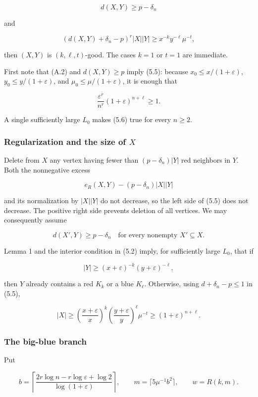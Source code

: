 \[
d(X,Y)\ge p-\delta_n
\tag{5.4}
\]

and

\[
(d(X,Y)+\delta_n-p)^r|X||Y|
\ge x^{-k}y^{-\ell}\mu^{-t},
\tag{5.5}
\]

then \((X,Y)\) is \((k,\ell,t)\)-good. The cases \(k=1\) or \(t=1\) are
immediate.

First note that (A.2) and \(d(X,Y)\ge p\) imply (5.5): because
\(x_0\le x/(1+\varepsilon)\), \(y_0\le y/(1+\varepsilon)\), and
\(\mu_0\le\mu/(1+\varepsilon)\), it is enough that

\[
\frac{\varepsilon^r}{n^r}(1+\varepsilon)^{n+\ell}\ge1.
\tag{5.6}
\]

A single sufficiently large \(L_0\) makes (5.6) true for every
\(n\ge2\).

\subsubsection{\texorpdfstring{Regularization and the size of
\(X\)}{Regularization and the size of X}}

Delete from \(X\) any vertex having fewer than \((p-\delta_n)|Y|\) red
neighbors in \(Y\). Both the nonnegative excess

\[
e_R(X,Y)-(p-\delta_n)|X||Y|
\]

and its normalization by \(|X||Y|\) do not decrease, so the left side of
(5.5) does not decrease. The positive right side prevents deletion of
all vertices. We may consequently assume

\[
d(X',Y)\ge p-\delta_n
\quad\text{for every nonempty }X'\subseteq X.
\tag{5.7}
\]

Lemma 1 and the interior condition in (5.2) imply, for sufficiently
large \(L_0\), that if

\[
|Y|\ge(x+\varepsilon)^{-k}(y+\varepsilon)^{-\ell},
\]

then \(Y\) already contains a red \(K_k\) or a blue \(K_\ell\).
Otherwise, using \(d+\delta_n-p\le1\) in (5.5),

\[
|X|
\ge\left(\frac{x+\varepsilon}{x}\right)^k
\left(\frac{y+\varepsilon}{y}\right)^\ell\mu^{-t}
\ge(1+\varepsilon)^{n+\ell}.
\tag{5.8}
\]

\subsubsection{The big-blue branch}

Put

\[
b=\left\lceil
\frac{2r\log n-r\log\varepsilon+\log2}{\log(1+\varepsilon)}
\right\rceil,\qquad
m=\lceil5\mu^{-1}b^2\rceil,\qquad w=R(k,m).
\tag{5.9}
\]

